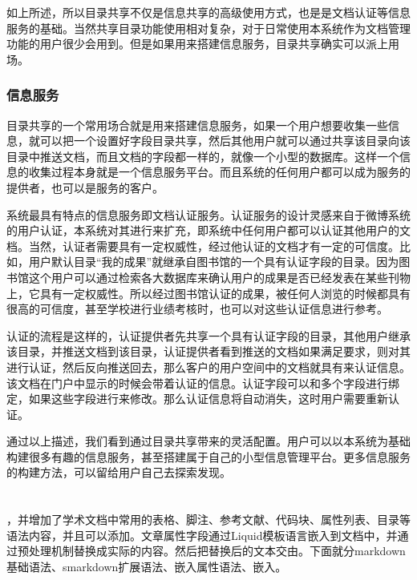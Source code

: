 如上所述，所以目录共享不仅是信息共享的高级使用方式，也是是文档认证等信息服务的基础。当然共享目录功能使用相对复杂，对于日常使用本系统作为文档管理功能的用户很少会用到。但是如果用来搭建信息服务，目录共享确实可以派上用场。

\subsubsection{信息服务}
\label{sec:service}

目录共享的一个常用场合就是用来搭建信息服务，如果一个用户想要收集一些信息，就可以把一个设置好字段目录共享，然后其他用户就可以通过共享该目录向该目录中推送文档，而且文档的字段都一样的，就像一个小型的数据库。这样一个信息的收集过程本身就是一个信息服务平台。而且系统的任何用户都可以成为服务的提供者，也可以是服务的客户。

系统最具有特点的信息服务即文档认证服务。认证服务的设计灵感来自于微博系统的用户认证，本系统对其进行来扩充，即系统中任何用户都可以认证其他用户的文档。当然，认证者需要具有一定权威性，经过他认证的文档才有一定的可信度。比如，用户默认目录“我的成果”就继承自图书馆的一个具有认证字段的目录。因为图书馆这个用户可以通过检索各大数据库来确认用户的成果是否已经发表在某些刊物上，它具有一定权威性。所以经过图书馆认证的成果，被任何人浏览的时候都具有很高的可信度，甚至学校进行业绩考核时，也可以对这些认证信息进行参考。

认证的流程是这样的，认证提供者先共享一个具有认证字段的目录，其他用户继承该目录，并推送文档到该目录，认证提供者看到推送的文档如果满足要求，则对其进行认证，然后反向推送回去，那么客户的用户空间中的文档就具有来认证信息。该文档在门户中显示的时候会带着认证的信息。认证字段可以和多个字段进行绑定，如果这些字段进行来修改。那么认证信息将自动消失，这时用户需要重新认证。

通过以上描述，我们看到通过目录共享带来的灵活配置。用户可以以本系统为基础构建很多有趣的信息服务，甚至搭建属于自己的小型信息管理平台。更多信息服务的构建方法，可以留给用户自己去探索发现。

\section{}
\label{sec:smarkdownsyntax}

，并增加了学术文档中常用的表格、脚注、参考文献、代码块、属性列表、目录等语法内容，并且可以添加。文章属性字段通过Liquid模板语言嵌入到文档中，并通过预处理机制替换成实际的内容。然后把替换后的文本交由。下面就分markdown基础语法、smarkdown扩展语法、嵌入属性语法、嵌入。

